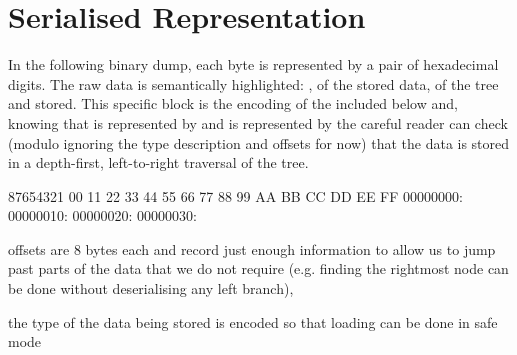 
\section{Serialised Representation}

In the following binary dump, each byte is represented by a pair of
hexadecimal digits.
%
The raw data is semantically highlighted: ,
 of the stored data,  of the
tree and  stored.
%
This specific block is the encoding of the  included
below and,
%
knowing that  is represented by 
and  is represented by 
%
the careful reader can check
(modulo ignoring the type description and offsets for now)
that the data is stored in a depth-first, left-to-right traversal of the tree.

\begin{hexdump}
87654321  00 11 22 33 44 55 66 77 88 99 AA BB CC DD EE FF
00000000:   
00000010:   
00000020:         
00000030:     
\end{hexdump}




offsets are 8 bytes each and record just enough information to
allow us to jump past parts of the data that we do not require (e.g. finding
the rightmost node can be done without deserialising any left branch),

the type of the data being stored is encoded so that loading
can be done in safe mode

